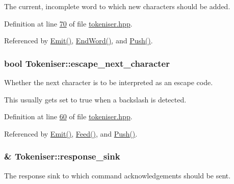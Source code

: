 The current, incomplete word to which new characters should be added. 



Definition at line \hyperlink{tokeniser_8hpp_source_l00070}{70} of file \hyperlink{tokeniser_8hpp_source}{tokeniser.\+hpp}.



Referenced by \hyperlink{tokeniser_8cpp_source_l00113}{Emit()}, \hyperlink{tokeniser_8cpp_source_l00103}{End\+Word()}, and \hyperlink{tokeniser_8cpp_source_l00094}{Push()}.

\hypertarget{classTokeniser_ace181afc0f1425b87126becc79458edd}{
\subsubsection[{escape\+\_\+next\+\_\+character}]{\setlength{\rightskip}{0pt plus 5cm}bool Tokeniser\+::escape\+\_\+next\+\_\+character\hspace{0.3cm}{\ttfamily [private]}}}\label{classTokeniser_ace181afc0f1425b87126becc79458edd}


Whether the next character is to be interpreted as an escape code. 

This usually gets set to true when a backslash is detected. 

Definition at line \hyperlink{tokeniser_8hpp_source_l00060}{60} of file \hyperlink{tokeniser_8hpp_source}{tokeniser.\+hpp}.



Referenced by \hyperlink{tokeniser_8cpp_source_l00113}{Emit()}, \hyperlink{tokeniser_8cpp_source_l00026}{Feed()}, and \hyperlink{tokeniser_8cpp_source_l00094}{Push()}.

\hypertarget{classTokeniser_a5ae6a740655de2f1cbc5f6723dd56439}{
\subsubsection[{response\+\_\+sink}]{\& Tokeniser\+::response\+\_\+sink\hspace{0.3cm}{\ttfamily [private]}}}\label{classTokeniser_a5ae6a740655de2f1cbc5f6723dd56439}


The response sink to which command acknowledgements should be sent. 

